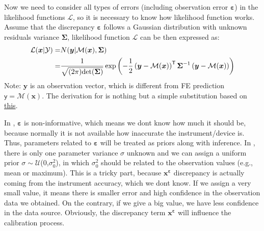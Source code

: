 \documentclass{ol-softwaremanual}
\begin{document}
Now we need to consider all types of errors (including observation error $\boldsymbol{\varepsilon}$) in the likelihood functions $\mathcal{L}$, so it is necessary to know how likelihood function works. Assume that the discrepancy $\boldsymbol{\varepsilon}$ follows a Gaussian distribution with unknown residuals variance $\boldsymbol{\Sigma}$, likelihood function $\mathcal{L}$ can be then expressed as:
\begin{equation}        
        \label{eq: Likelihood function}
\begin{aligned}
 \mathcal{L}(\boldsymbol{x}|\mathcal{Y}) =& N(\boldsymbol{y}|\mathcal{M}(\boldsymbol{x}),\boldsymbol{\Sigma}) \\
 =&  \frac{1}{\sqrt{(2 \pi){\rm{det}} 
 (\boldsymbol{\Sigma})}}\exp\left(-\frac{1}{2}\left(\boldsymbol{y}  - \mathcal{M}(\boldsymbol{x})\right)^{\mathsf{T}} \boldsymbol{\Sigma}^{-1}\left(\boldsymbol{y}  - \mathcal{M}(\boldsymbol{x})\right)\right)
\end{aligned}
\end{equation}
Note: $\boldsymbol{y}$ is an observation vector, which is different from FE prediction $\boldsymbol{\mathsf{y}} = \mathcal{M}(\boldsymbol{x})$. The derivation for  is nothing but a simple substitution based on \href{https://en.wikipedia.org/wiki/Normal_distribution}{this}.

In , $\boldsymbol{\varepsilon}$ is non-informative, which means we dont know how much it should be, because normally it is not available how inaccurate the instrument/device is. Thus, parameters related to $\boldsymbol{\varepsilon}$ will be treated as priors along with inference. In , there is only one parameter variance $\sigma$ unknown and we can assign a uniform prior $\sigma\sim \mathcal{U}$(0,$\sigma_{0}^2$), in which $\sigma_{0}^2$ should be related to the observation values (e.g., mean or maximum). This is a tricky part, because $\boldsymbol{x^{\varepsilon}}$ discrepancy is actually coming from the instrument accuracy, which we dont know. If we assign a very small value, it means there is smaller error and high confidence in the observation data we obtained. On the contrary, if we give a big value, we have less confidence in the data source. Obviously, the discrepancy term $\boldsymbol{x^{\varepsilon}}$ will influence the calibration process.
\end{document}
